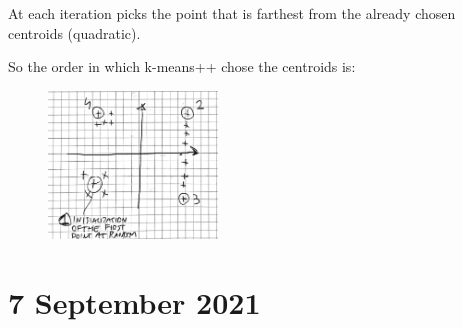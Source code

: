 \documentclass[a4paper,11pt,oneside]{book}
\begin{document}
\begin{enumerate}
\begin{solution}
            At each iteration picks the point that is farthest from the already chosen centroids (quadratic).
            
            So the order in which k-means++ chose the centroids is:
            
            \begin{figure}[H]
                \centering
                \includegraphics[width=0.4\textwidth,height=0.4\textheight,keepaspectratio]{images/graph_3_4_Feb_2022.png}
            \end{figure}
        \end{solution}
    \end{enumerate}

\chapter{7 September 2021}
\end{document}
